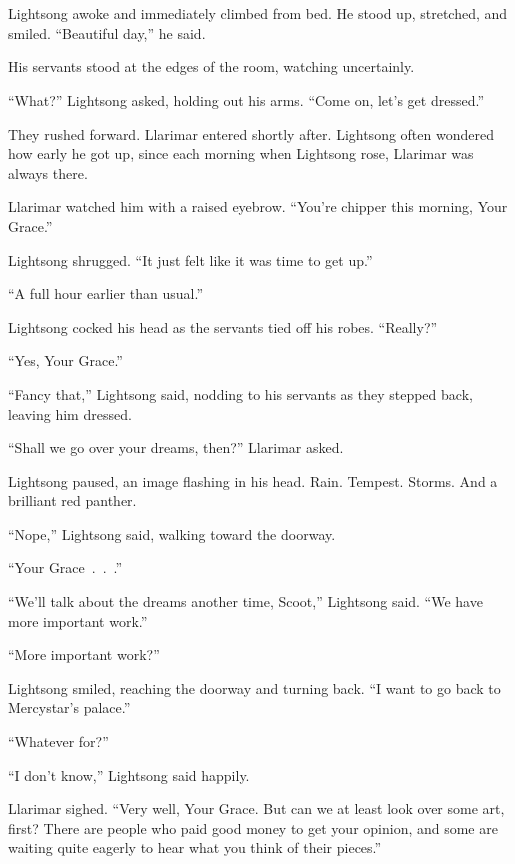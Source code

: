 \chapter{}

Lightsong awoke and immediately climbed from bed. He stood up, stretched, and smiled. “Beautiful day,” he said.

His servants stood at the edges of the room, watching uncertainly.

“What?” Lightsong asked, holding out his arms. “Come on, let’s get dressed.”

They rushed forward. Llarimar entered shortly after. Lightsong often wondered how early he got up, since each morning when Lightsong rose, Llarimar was always there.

Llarimar watched him with a raised eyebrow. “You’re chipper this morning, Your Grace.”

Lightsong shrugged. “It just felt like it was time to get up.”

“A full hour earlier than usual.”

Lightsong cocked his head as the servants tied off his robes. “Really?”

“Yes, Your Grace.”

“Fancy that,” Lightsong said, nodding to his servants as they stepped back, leaving him dressed.

“Shall we go over your dreams, then?” Llarimar asked.

Lightsong paused, an image flashing in his head. Rain. Tempest. Storms. And a brilliant red panther.

“Nope,” Lightsong said, walking toward the doorway.

“Your Grace~.~.~.”

“We’ll talk about the dreams another time, Scoot,” Lightsong said. “We have more important work.”

“More important work?”

Lightsong smiled, reaching the doorway and turning back. “I want to go back to Mercystar’s palace.”

“Whatever for?”

“I don’t know,” Lightsong said happily.

Llarimar sighed. “Very well, Your Grace. But can we at least look over some art, first? There are people who paid good money to get your opinion, and some are waiting quite eagerly to hear what you think of their pieces.”

